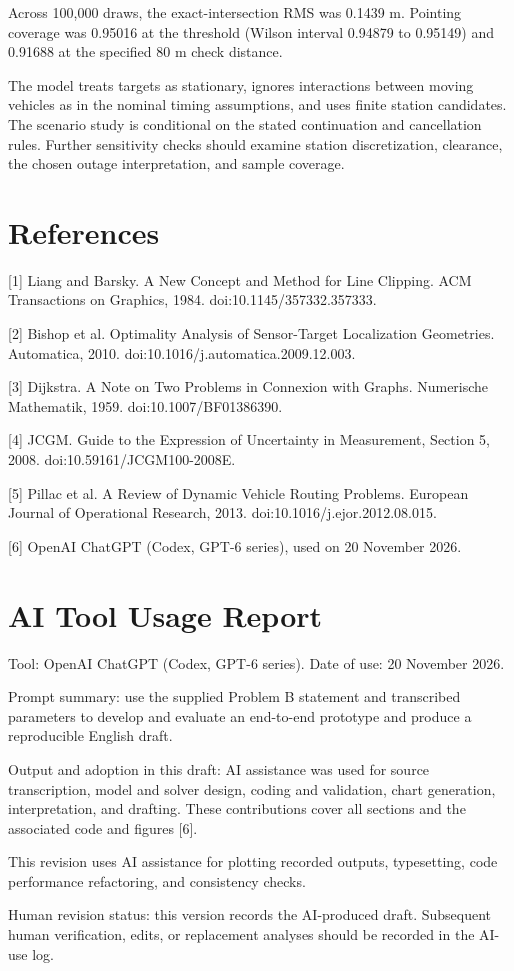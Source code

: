 \documentclass[12pt,a4paper]{article}
\begin{document}
Across 100,000 draws, the exact-intersection RMS was 0.1439 m. Pointing coverage was 0.95016 at the threshold (Wilson interval 0.94879 to 0.95149) and 0.91688 at the specified 80 m check distance.

The model treats targets as stationary, ignores interactions between moving vehicles as in the nominal timing assumptions, and uses finite station candidates. The scenario study is conditional on the stated continuation and cancellation rules. Further sensitivity checks should examine station discretization, clearance, the chosen outage interpretation, and sample coverage.

\section{References}

\begingroup\raggedright

[1] Liang and Barsky. A New Concept and Method for Line Clipping. ACM Transactions on Graphics, 1984. doi:10.1145/357332.357333.

[2] Bishop et al. Optimality Analysis of Sensor-Target Localization Geometries. Automatica, 2010. doi:10.1016/j.automatica.2009.12.003.

[3] Dijkstra. A Note on Two Problems in Connexion with Graphs. Numerische Mathematik, 1959. doi:10.1007/BF01386390.

[4] JCGM. Guide to the Expression of Uncertainty in Measurement, Section 5, 2008. doi:10.59161/JCGM100-2008E.

[5] Pillac et al. A Review of Dynamic Vehicle Routing Problems. European Journal of Operational Research, 2013. doi:10.1016/j.ejor.2012.08.015.

[6] OpenAI ChatGPT (Codex, GPT-6 series), used on 20 November 2026.

\par\endgroup

\clearpage

\section{AI Tool Usage Report}

Tool: OpenAI ChatGPT (Codex, GPT-6 series). Date of use: 20 November 2026.

Prompt summary: use the supplied Problem B statement and transcribed parameters to develop and evaluate an end-to-end prototype and produce a reproducible English draft.

Output and adoption in this draft: AI assistance was used for source transcription, model and solver design, coding and validation, chart generation, interpretation, and drafting. These contributions cover all sections and the associated code and figures [6].

This revision uses AI assistance for plotting recorded outputs, typesetting, code performance refactoring, and consistency checks.

Human revision status: this version records the AI-produced draft. Subsequent human verification, edits, or replacement analyses should be recorded in the AI-use log.
\end{document}
